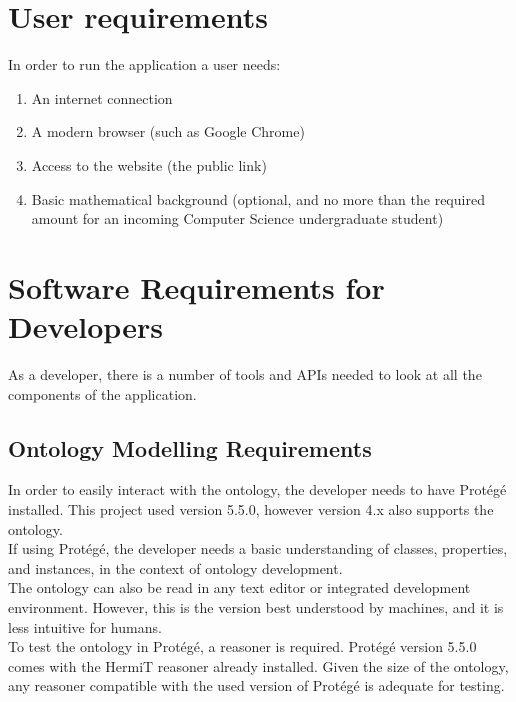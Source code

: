 \documentclass[12pt]{report}
\begin{document}
	\section{User requirements}
	In order to run the application a user needs:
	\begin{enumerate}
	    \item An internet connection
	    \item A modern browser (such as Google Chrome)
	    \item Access to the website (the public link)
	    \item Basic mathematical background (optional, and no more than the required amount for an incoming Computer Science undergraduate student)
	\end{enumerate}
	
	\section{Software Requirements for Developers}
	As a developer, there is a number of tools and APIs needed to look at all the components of the application.
	
	\subsection{Ontology Modelling Requirements}
	In order to easily interact with the ontology, the developer needs to have Protégé installed. This project used version 5.5.0, however version 4.x also supports the ontology.\\
	If using Protégé, the developer needs a basic understanding of classes, properties, and instances, in the context of ontology development.\\
	The ontology can also be read in any text editor or integrated development environment. However, this is the version best understood by machines, and it is less intuitive for humans.\\
	To test the ontology in Protégé, a reasoner is required. Protégé version 5.5.0 comes with the HermiT reasoner already installed. Given the size of the ontology, any reasoner compatible with the used version of Protégé is adequate for testing.
	
\end{document}
